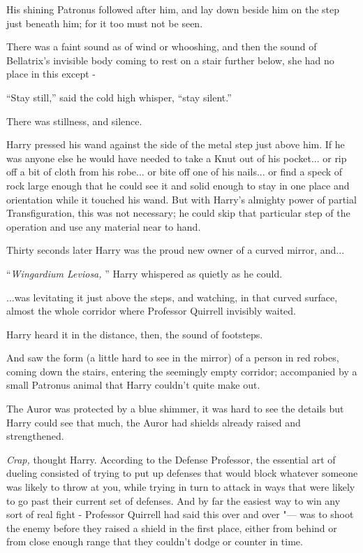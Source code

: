 His shining Patronus followed after him, and lay down beside him on the
step just beneath him; for it too must not be seen.

There was a faint sound as of wind or whooshing, and then the sound of
Bellatrix's invisible body coming to rest on a stair further below, she
had no place in this except -

``Stay still,'' said the cold high whisper, ``stay silent.''

There was stillness, and silence.

Harry pressed his wand against the side of the metal step just above
him. If he was anyone else he would have needed to take a Knut out of
his pocket... or rip off a bit of cloth from his robe... or
bite off one of his nails... or find a speck of rock large enough
that he could see it and solid enough to stay in one place and
orientation while it touched his wand. But with Harry's almighty power
of partial Transfiguration, this was not necessary; he could skip that
particular step of the operation and use any material near to hand.

Thirty seconds later Harry was the proud new owner of a curved mirror,
and...

``\emph{Wingardium Leviosa,} '' Harry whispered as quietly as he could.

...was levitating it just above the steps, and watching, in that
curved surface, almost the whole corridor where Professor Quirrell
invisibly waited.

Harry heard it in the distance, then, the sound of footsteps.

And saw the form (a little hard to see in the mirror) of a person in red
robes, coming down the stairs, entering the seemingly empty corridor;
accompanied by a small Patronus animal that Harry couldn't quite make
out.

The Auror was protected by a blue shimmer, it was hard to see the
details but Harry could see that much, the Auror had shields already
raised and strengthened.

\emph{Crap,} thought Harry. According to the Defense Professor, the
essential art of dueling consisted of trying to put up defenses that
would block whatever someone was likely to throw at you, while trying in
turn to attack in ways that were likely to go past their current set of
defenses. And by far the easiest way to win any sort of real fight -
Professor Quirrell had said this over and over "--- was to shoot the enemy
before they raised a shield in the first place, either from behind or
from close enough range that they couldn't dodge or counter in time.

